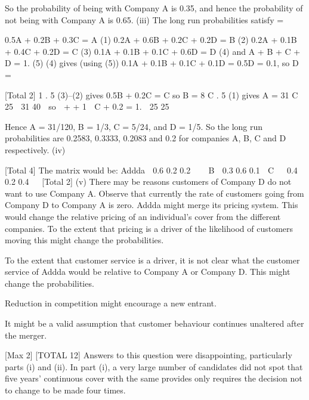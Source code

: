 \documentclass[a4paper,12pt]{article}
\begin{document}
So the probability of being with Company A is 0.35,
and hence the probability of not being with Company A is 0.65.
(iii)
The long run probabilities satisfy
\piP = \pi

0.5\pi A + 0.2\pi B + 0.3\pi C = \pi A (1) 0.2\pi A + 0.6\pi B + 0.2\pi C + 0.2\pi D = \pi B (2) 0.2\pi A + 0.1\pi B + 0.4\pi C + 0.2\pi D = \pi C (3) 0.1\pi A + 0.1\pi B + 0.1\pi C + 0.6\pi D = \pi D (4) 
and \pi A + \pi B + \pi C + \pi D = 1. (5) 
(4) gives (using (5))
0.1\pi A + 0.1\pi B + 0.1\pi C + 0.1\pi D = 0.5\pi D = 0.1,
so
\pi D =

[Total 2]
1
.
5%
(3)–(2) gives
0.5\pi B + 0.2\pi C = \pi C
so \pi B =
8
\pi C .
5
(1) gives
\pi A =
31
\pi C
25
 31 40 
so  + + 1  \pi C + 0.2 = 1.
 25 25 

Hence \pi A = 31/120, \pi B = 1/3, \pi C = 5/24, and \pi D = 1/5.
So the long run probabilities are 0.2583, 0.3333, 0.2083 and 0.2
for companies A, B, C and D respectively.
(iv)


[Total 4]
The matrix would be:
Addda  0.6 0.2 0.2 


B  0.3 0.6 0.1 
C   0.4 0.2 0.4  
[Total 2]
(v)
There may be reasons customers of Company D do not want to use
Company A. 
Observe that currently the rate of customers going from Company D to
Company A is zero. 
Addda might merge its pricing system. This would change the relative pricing
of an individual’s cover from the different companies. To the extent that
pricing is a driver of the likelihood of customers moving this might change the
probabilities.

To the extent that customer service is a driver, it is not clear what the customer
service of Addda would be relative to Company A or Company D. This might
change the probabilities.

Reduction in competition might encourage a new entrant.

It might be a valid assumption that customer behaviour continues unaltered
after the merger.

[Max 2]
[TOTAL 12]
Answers to this question were disappointing, particularly parts (i) and (ii). In
part (i), a very large number of candidates did not spot that five years’
continuous cover with the same provides only requires the decision not to
change to be made four times.
\end{document}
